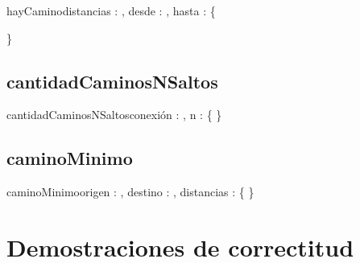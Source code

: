 \documentclass[10pt,a4paper]{article}
\begin{document}
\begin{proc}{hayCamino}{\In distancias : \TLista{\TLista{\ent}}, \In desde : \ent, \In hasta : \ent}{\bool \{ } 
	
	
	\}
\end{proc}

\subsection{cantidadCaminosNSaltos}

\begin{proc}{cantidadCaminosNSaltos}{\Inout conexión : \TLista{\TLista{\ent}}, \In n : \ent}{ \{ } 
	\requiere{\{ \True\}}
	\asegura{\{\True\}}
	\}
\end{proc}

\subsection{caminoMinimo}

\begin{proc}{caminoMinimo}{\In origen : \ent, \In destino : \ent, \In distancias : \TLista{\TLista{\ent}}}{\TLista{\ent} \{ } 
	\requiere{\{ \True \}}
	\asegura{\{\True\}}
	\}
\end{proc}

\section{Demostraciones de correctitud}
\end{document}
